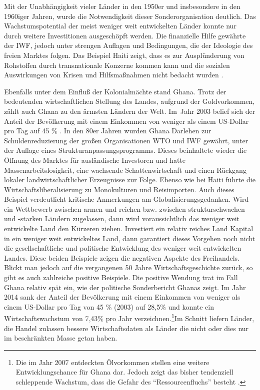  Mit der Unabh{\"a}ngigkeit vieler L{\"a}nder in den  1950er und insbesondere in den 1960iger Jahren, wurde die Notwendigkeit dieser Sonderorganisation deutlich. Das Wachstumspotential der meist weniger weit entwickelten L{\"a}nder konnte nur durch weitere Investitionen ausgesch{\"o}pft werden. Die finanzielle Hilfe gew{\"a}hrte der IWF, jedoch unter strengen Auflagen und Bedingungen, die der Ideologie des freien Marktes folgen. Das Beispiel Haiti zeigt, dass es zur Auspl{\"u}nderung von Rohstoffen durch transnationale Konzerne kommen kann und die sozialen Auswirkungen von Krisen und Hilfsma{\ss}nahmen nicht bedacht wurden \citep{IBP.2013}.\newline
 
 
Ebenfalls unter dem Einflu{\ss} der Kolonialm{\"a}chte stand Ghana. Trotz der bedeutenden wirtschaftlichen Stellung des Landes, aufgrund der Goldvorkommen, z{\"a}hlt auch Ghana zu den {\"a}rmsten L{\"a}ndern der Welt. Im~Jahr 2003 belief sich der Anteil der Bev{\"o}lkerung mit einem Einkommen von weniger als einem US-Dollar pro Tag auf 45 {\%} \citep{Regeher.2013}. In den 80er Jahren wurden Ghana Darlehen zur Schuldenreduzierung der gro{\ss}en Organisationen WTO und IWF gew{\"a}hrt, unter der Auflage eines Strukturanpassungsprogramms. Dieses beinhaltete wieder die {\"O}ffnung des Marktes f{\"u}r ausl{\"a}ndische Investoren und hatte Massenarbeitslosigkeit, eine wachsende Schattenwirtschaft und einen R{\"u}ckgang lokaler landwirtschaftlicher Erzeugnisse zur Folge. Ebenso wie bei Haiti f{\"u}hrte die Wirtschaftsliberalisierung zu Monokulturen und Reisimporten. \newline Auch dieses Beispiel verdeutlicht kritische Anmerkungen am Globalisierungsgedanken. Wird ein Wettbewerb zwischen armen und reichen bzw. zwischen strukturschwachen und -starken L{\"a}ndern zugelassen, dann wird voraussichtlich das weniger weit entwickelte Land den K{\"u}rzeren ziehen. Investiert ein relativ reiches Land Kapital in ein weniger weit entwickeltes Land, dann garantiert dieses Vorgehen noch nicht die gesellschaftliche und politische Entwicklung des weniger weit entwickelten Landes. \newline Diese beiden Beispiele zeigen die negativen Aspekte des Freihandels. Blickt man jedoch auf die vergangenen 50 Jahre Wirtschaftsgeschichte zur{\"u}ck, so gibt es auch zahlreiche positive Beispiele. Die positive Wendung trat im Fall Ghana relativ sp{\"a}t ein, wie der politische Sonderbericht Ghanas zeigt. Im Jahr 2014 sank der Anteil der Bev{\"o}lkerung mit einem Einkommen von weniger als einem US-Dollar pro Tag von 45 {\%} (2003) auf 28,5{\%} und konnte ein Wirtschaftswachstum von 7,43{\%} pro Jahr verzeichnen.\footnote{Die im Jahr 2007 entdeckten Ölvorkommen stellen eine weitere Entwicklungschance für Ghana dar. Jedoch zeigt das bisher tendenziell schleppende Wachstum, dass die Gefahr des "`Ressourcenfluchs"' besteht \citep{Regeher.2013}.}\newline  Im Schnitt liefern L{\"a}nder, die Handel zulassen bessere Wirtschaftsdaten als L{\"a}nder die nicht oder dies nur im beschr{\"a}nkten Masse getan haben.\newline


